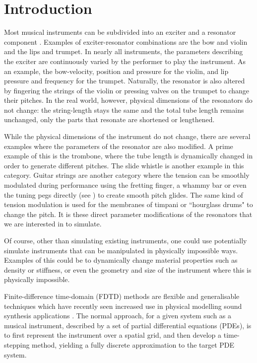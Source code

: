 \section{Introduction}
Most musical instruments can be subdivided into an exciter and a resonator component \cite{Borin1989}. Examples of exciter-resonator combinations are the bow and violin and the lips and trumpet. In nearly all instruments, the parameters describing the exciter are continuously varied by the performer to play the instrument. As an example, the bow-velocity, position and pressure for the violin, and lip pressure and frequency for the trumpet. Naturally, the resonator is also altered by fingering the strings of the violin or pressing valves on the trumpet to change their pitches. In the real world, however, physical dimensions of the resonators do not change: the string-length stays the same and the total tube length remains unchanged, only the parts that resonate are shortened or lengthened.

While the physical dimensions of the instrument do not change, there are several examples where the parameters of the resonator are also modified. A prime example of this is the trombone, where the tube length is dynamically changed in order to generate different pitches. The slide whistle is another example in this category. Guitar strings are another category where the tension can be smoothly modulated during performance using the fretting finger, a whammy bar or even the tuning pegs directly (see \cite{Gomm2011}) to create smooth pitch glides. The same kind of tension modulation is used for the membranes of timpani or ``hourglass drums" to change the pitch. 
It is these direct parameter modifications of the resonators that we are interested in to simulate. 

Of course, other than simulating existing instruments, one could use potentially simulate instruments that can be manipulated in physically impossible ways. Examples of this could be to dynamically change material properties such as density or stiffness, or even the geometry and size of the instrument where this is physically impossible.

Finite-difference time-domain (FDTD) methods are flexible and generalisable techniques which have recently seen increased use in physical modelling sound synthesis applications \cite{bilbao2009} . The normal approach, for a given system such as a musical instrument, described by a set of partial differential equations (PDEs), is to first represent the instrument over a spatial grid, and then develop a time-stepping method, yielding a fully discrete approximation to the target PDE system. 

